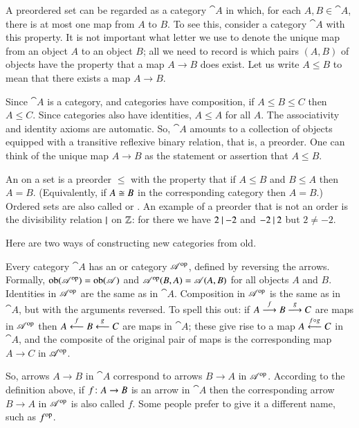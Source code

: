 \begin{examples}
\begin{enumerate}[(b)]
A preordered set can be regarded as a category $\cat{A}$ in which, for each
$A, B \in \cat{A}$, there is at most one map from $A$ to $B$.  To see this,
consider a category $\cat{A}$ with this property.  It is not important what
letter we use to denote the unique map from an object $A$ to an object $B$;
all we need to record is which pairs $(A, B)$ of objects have the property
that a map $A \to B$ does exist.  Let us write $A \leq B$ to mean that
there exists a map $A \to B$.

Since $\cat{A}$ is a category, and categories have composition, if $A \leq
B \leq C$ then $A \leq C$.  Since categories also have identities, $A \leq
A$ for all $A$.  The associativity and identity axioms are automatic.  So,
$\cat{A}$ amounts to a collection of objects equipped with a transitive
reflexive binary relation, that is, a preorder.  One can think of the
unique map $A \to B$ as the statement or assertion that $A \leq B$.

An %
%
%
on a set is a preorder $\leq$ with the property that if $A \leq B$ and $B
\leq A$ then $A = B$.  (Equivalently, if $A \cong B$ in the corresponding
category then $A = B$.)  Ordered sets are also called %
%
%
or .%
%
%
An example of a preorder that is not%
%
%
an order is the divisibility relation $\mathbin{\mid}$ on $\mathbb{Z}$: for there
we have $2 \mathbin{\mid} {-2}$ and $-2 \mathbin{\mid} 2$ but $2 \neq -2$.
\end{enumerate}
\end{examples}

Here are two ways of constructing new categories from old.

{\sloppy
\begin{constn}
\label{constn:op-cat}
Every category $\cat{A}$ has an %
%
%
or %
%
%
category $\mathscr{A}^{\mathrm{op}}$,%
%
%
defined by reversing the arrows.  Formally, $\operatorname{ob}(\mathscr{A}^{\mathrm{op}}) =
\operatorname{ob}(\mathscr{A})$ and $\mathscr{A}^{\mathrm{op}}(B, A) = \mathscr{A}(A, B)$ for all objects $A$
and $B$.  Identities in $\mathscr{A}^{\mathrm{op}}$ are the same as in $\cat{A}$.
Composition in $\mathscr{A}^{\mathrm{op}}$ is the same as in $\cat{A}$, but with the
arguments reversed.  To spell this out: if $A \stackrel{f}{\longrightarrow} B \stackrel{g}{\longrightarrow} C$ are
maps in $\mathscr{A}^{\mathrm{op}}$ then $A \stackrel{f}{\longleftarrow} B \stackrel{g}{\longleftarrow} C$ are maps in $\cat{A}$;
these give rise to a map $A \stackrel{f \mathbin{\circ} g}{\longleftarrow} C$ in $\cat{A}$, and the
composite of the original pair of maps is the corresponding map $A \to C$
in $\mathscr{A}^{\mathrm{op}}$.

So, arrows $A \to B$ in $\cat{A}$ correspond to arrows $B \to A$ in
$\mathscr{A}^{\mathrm{op}}$.  According to the definition above, if $f\from A \to B$ is
an arrow in $\cat{A}$ then the corresponding arrow $B \to A$ in
$\mathscr{A}^{\mathrm{op}}$ is also called $f$.  Some people prefer to give it a
different name, such as $f^{\mathrm{op}}$.
\end{constn}
}

